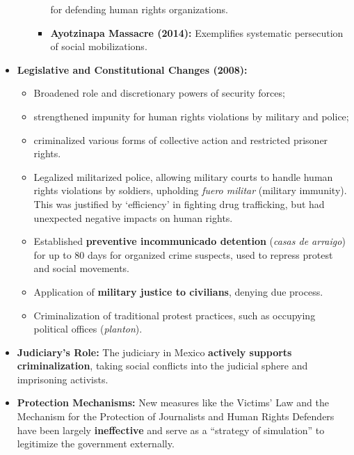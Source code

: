 \documentclass{article}
\begin{document}
\begin{itemize}
\begin{itemize}
\begin{itemize}
            for defending human rights organizations.
            \item \textbf{Ayotzinapa Massacre (2014):} Exemplifies
            systematic persecution of social mobilizations.
        \end{itemize}
    \end{itemize}
    \item \textbf{Legislative and Constitutional Changes (2008):}
    \begin{itemize}
        \item Broadened role and discretionary powers of security forces;
        \item strengthened impunity for human rights violations by military
        and police;
        \item criminalized various forms of collective action and restricted
        prisoner rights.
        \item Legalized militarized police, allowing military courts to
        handle human rights violations by soldiers, upholding
        \textit{fuero militar} (military immunity). This was justified by
        `efficiency' in fighting drug trafficking, but had unexpected
        negative impacts on human rights.
        \item Established \textbf{preventive incommunicado detention} (\textit{casas de arraigo}) for up to 80 days for organized crime suspects, used to repress protest and social movements.
        \item Application of \textbf{military justice to civilians},
        denying due process.
        \item Criminalization of traditional protest practices, such as
        occupying political offices (\textit{planton}).
    \end{itemize}
    \item \textbf{Judiciary's Role:} The judiciary in Mexico
    \textbf{actively supports criminalization}, taking social conflicts into
    the judicial sphere and imprisoning activists.
    \item \textbf{Protection Mechanisms:} New measures like the Victims' Law
    and the Mechanism for the Protection of Journalists and Human Rights
    Defenders have been largely \textbf{ineffective} and serve as a
    ``strategy of simulation'' to legitimize the government externally.
\end{itemize}
\end{document}
